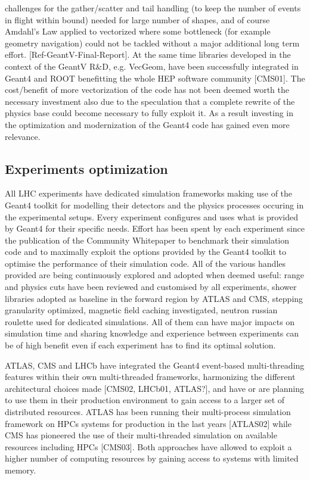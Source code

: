 \documentclass[11pt,a4paper]{article}
\begin{document}
challenges for the gather/scatter and tail handling (to keep the number
of events in flight within bound) needed for large number of shapes, and
of course Amdahl's Law applied to vectorized where some bottleneck (for
example geometry navigation) could not be tackled without a major
additional long term effort. {[}Ref-GeantV-Final-Report{]}. At the same
time libraries developed in the context of the GeantV R\&D, e.g.
VecGeom, have been successfully integrated in Geant4 and ROOT
benefitting the whole HEP software community {[}CMS01{]}. The
cost/benefit of more vectorization of the code has not been deemed worth
the necessary investment also due to the speculation that a complete
rewrite of the physics base could become necessary to fully exploit it.
As a result investing in the optimization and modernization of the
Geant4 code has gained even more relevance.

\hypertarget{experiments-optimization}{%
\subsection{Experiments optimization}\label{experiments-optimization}}

All LHC experiments have dedicated simulation frameworks making use of
the Geant4 toolkit for modelling their detectors and the physics
processes occuring in the experimental setups. Every experiment
configures and uses what is provided by Geant4 for their specific needs.
Effort has been spent by each experiment since the publication of the
Community Whitepaper to benchmark their simulation code and to maximally
exploit the options provided by the Geant4 toolkit to optimise the
performance of their simulation code. All of the various handles
provided are being continuously explored and adopted when deemed useful:
range and physics cuts have been reviewed and customised by all
experiments, shower libraries adopted as baseline in the forward region
by ATLAS and CMS, stepping granularity optimized, magnetic field caching
investigated, neutron russian roulette used for dedicated simulations.
All of them can have major impacts on simulation time and sharing
knowledge and experience between experiments can be of high benefit even
if each experiment has to find its optimal solution.

ATLAS, CMS and LHCb have integrated the Geant4 event-based
multi-threading features within their own multi-threaded frameworks,
harmonizing the different architectural choices made {[}CMS02, LHCb01,
ATLAS?{]}, and have or are planning to use them in their production
environment to gain access to a larger set of distributed resources.
ATLAS has been running their multi-process simulation framework on HPCs
systems for production in the last years {[}ATLAS02{]} while CMS has
pioneered the use of their multi-threaded simulation on available
resources including HPCs {[}CMS03{]}. Both approaches have allowed to
exploit a higher number of computing resources by gaining access to
systems with limited memory.
\end{document}
